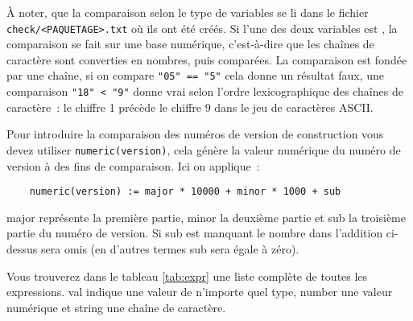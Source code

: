     À noter, que la comparaison selon le type de variables se li dans le fichier
	\texttt{check/<PAQUETAGE>.txt} où ils ont été créés. Si l'une des deux variables est
	, la comparaison se fait sur une base numérique,
	c'est-à-dire que les chaînes de caractère sont converties en nombres, puis comparées.
	La comparaison est fondée par une chaîne, si on compare \texttt{"05"\ == "5"}
	cela donne un résultat \og{}faux\fg{}, une comparaison \texttt{"18"\ < "9"} donne \og{}vrai\fg{}
	selon l'ordre lexicographique des chaînes de caractère~: le chiffre \og{}1\fg{} précède
	le chiffre \og{}9\fg{} dans le jeu de caractères ASCII.

    Pour introduire la comparaison des numéros de version de construction vous devez utiliser
	\texttt{numeric(version)}, cela génère la valeur numérique du numéro de version à des fins
	de comparaison. Ici on applique~:

\begin{example}
\begin{verbatim}
    numeric(version) := major * 10000 + minor * 1000 + sub
\end{verbatim}
\end{example}

    \og{}major\fg{} représente la première partie, \og{}minor\fg{} la deuxième partie et \og{}sub\fg{}
	la troisième partie du numéro de version. Si \og{}sub\fg{} est manquant le nombre dans l'addition
	ci-dessus sera omis (en d'autres termes \og{}sub\fg{} sera égale à zéro).

    Vous trouverez dans le tableau \ref{tab:expr} une liste complète de toutes les expressions.
	\og{}val\fg{} indique une valeur de n'importe quel type, \og{}number\fg{} une valeur numérique
	et \og{}string\fg{} une chaîne de caractère.

